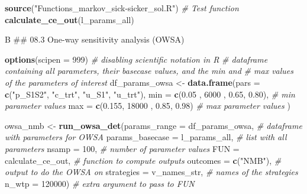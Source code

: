 \documentclass[]{article}
\newenvironment{Shaded}{\begin{snugshade}}{\end{snugshade}}
\newcommand{\KeywordTok}[1]{\textcolor[rgb]{0.13,0.29,0.53}{\textbf{#1}}}
\newcommand{\DataTypeTok}[1]{\textcolor[rgb]{0.13,0.29,0.53}{#1}}
\newcommand{\DecValTok}[1]{\textcolor[rgb]{0.00,0.00,0.81}{#1}}
\newcommand{\FloatTok}[1]{\textcolor[rgb]{0.00,0.00,0.81}{#1}}
\newcommand{\StringTok}[1]{\textcolor[rgb]{0.31,0.60,0.02}{#1}}
\newcommand{\CommentTok}[1]{\textcolor[rgb]{0.56,0.35,0.01}{\textit{#1}}}
\newcommand{\NormalTok}[1]{#1}
\begin{document}
\begin{Shaded}
\begin{Highlighting}[]
\KeywordTok{source}\NormalTok{(}\StringTok{"Functions_markov_sick-sicker_sol.R"}\NormalTok{)}
\CommentTok{# Test function}
\KeywordTok{calculate_ce_out}\NormalTok{(l_params_all)}
\end{Highlighting}
\end{Shaded}

B \#\# 08.3 One-way sensitivity analysis (OWSA)

\begin{Shaded}
\begin{Highlighting}[]
\KeywordTok{options}\NormalTok{(}\DataTypeTok{scipen =} \DecValTok{999}\NormalTok{) }\CommentTok{# disabling scientific notation in R}
\CommentTok{# dataframe containing all parameters, their basecase values, and the min and }
\CommentTok{# max values of the parameters of interest }
\NormalTok{df_params_owsa <-}\StringTok{ }\KeywordTok{data.frame}\NormalTok{(}\DataTypeTok{pars =} \KeywordTok{c}\NormalTok{(}\StringTok{"p_S1S2"}\NormalTok{, }\StringTok{"c_trt"}\NormalTok{, }\StringTok{"u_S1"}\NormalTok{, }\StringTok{"u_trt"}\NormalTok{),}
                             \DataTypeTok{min  =} \KeywordTok{c}\NormalTok{(}\FloatTok{0.05}\NormalTok{ ,  }\DecValTok{6000}\NormalTok{ , }\FloatTok{0.65}\NormalTok{, }\FloatTok{0.80}\NormalTok{),  }\CommentTok{# min parameter values}
                             \DataTypeTok{max  =} \KeywordTok{c}\NormalTok{(}\FloatTok{0.155}\NormalTok{, }\DecValTok{18000}\NormalTok{ , }\FloatTok{0.85}\NormalTok{, }\FloatTok{0.98}\NormalTok{)   }\CommentTok{# max parameter values}
\NormalTok{                             )}

\NormalTok{owsa_nmb  <-}\StringTok{ }\KeywordTok{run_owsa_det}\NormalTok{(}\DataTypeTok{params_range     =}\NormalTok{ df_params_owsa,    }\CommentTok{# dataframe with parameters for OWSA}
                          \DataTypeTok{params_basecase  =}\NormalTok{ l_params_all,      }\CommentTok{# list with all parameters}
                          \DataTypeTok{nsamp            =} \DecValTok{100}\NormalTok{,               }\CommentTok{# number of parameter values}
                          \DataTypeTok{FUN              =}\NormalTok{ calculate_ce_out,  }\CommentTok{# function to compute outputs}
                          \DataTypeTok{outcomes         =} \KeywordTok{c}\NormalTok{(}\StringTok{"NMB"}\NormalTok{),          }\CommentTok{# output to do the OWSA on}
                          \DataTypeTok{strategies       =}\NormalTok{ v_names_str,       }\CommentTok{# names of the strategies}
                          \DataTypeTok{n_wtp            =} \DecValTok{120000}\NormalTok{)            }\CommentTok{# extra argument to pass to FUN}
\end{Highlighting}
\end{Shaded}
\end{document}
